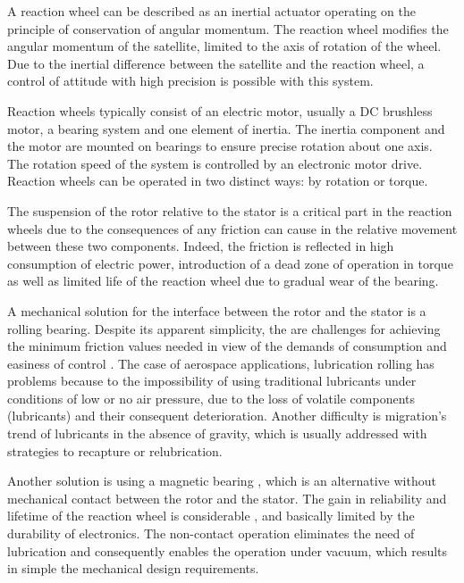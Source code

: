\documentclass[10pt,fleqn,a4paper,twoside]{article}
\begin{document}
	A reaction wheel can be described as an inertial actuator operating on the principle of conservation of angular momentum. The reaction wheel modifies the angular momentum of the satellite, limited to the axis of rotation of the wheel. Due to the inertial difference between the satellite and the reaction wheel, a control of attitude with high precision is possible with this system. 
	
	Reaction wheels typically consist of an electric motor, usually a DC brushless motor, a bearing system and one element of inertia. The inertia component and the motor are mounted on bearings to ensure precise rotation about one axis. The rotation speed of the system is controlled by an electronic motor drive. Reaction wheels can be operated in two distinct ways: by rotation or torque.
	
	The suspension of the rotor relative to the stator is a critical part in the reaction wheels \citep{taniwaki2003experimental} due to the consequences of any friction can cause in the relative movement between these two components. Indeed, the friction is reflected  in high consumption of electric power, introduction of a dead zone of operation in torque as well as limited life of the reaction wheel due to gradual wear of the bearing.
	
	A  mechanical solution for the interface between the rotor and the stator is a rolling bearing. Despite its apparent simplicity, the are challenges for achieving the minimum friction values needed in view of the demands of consumption and easiness of control \citep{Krishnan2010}.
	The case of aerospace applications, lubrication rolling has problems because to the impossibility of using traditional lubricants under conditions of low or no air pressure, due to the loss of volatile components (lubricants) and their consequent deterioration. Another difficulty is migration's trend of lubricants in the absence of gravity, which is usually addressed with strategies to recapture or relubrication.
	
	Another solution is using a magnetic bearing \citep{Bangcheng2012, bleuler2009magnetic}, which is an alternative without mechanical contact between the rotor and the stator. The gain in reliability and lifetime of the reaction wheel is considerable \citep{Marble2006}, and basically limited by the durability of electronics. The non-contact operation eliminates the need of lubrication and consequently enables the operation under vacuum, which results in simple the mechanical design requirements.
	
\end{document}
